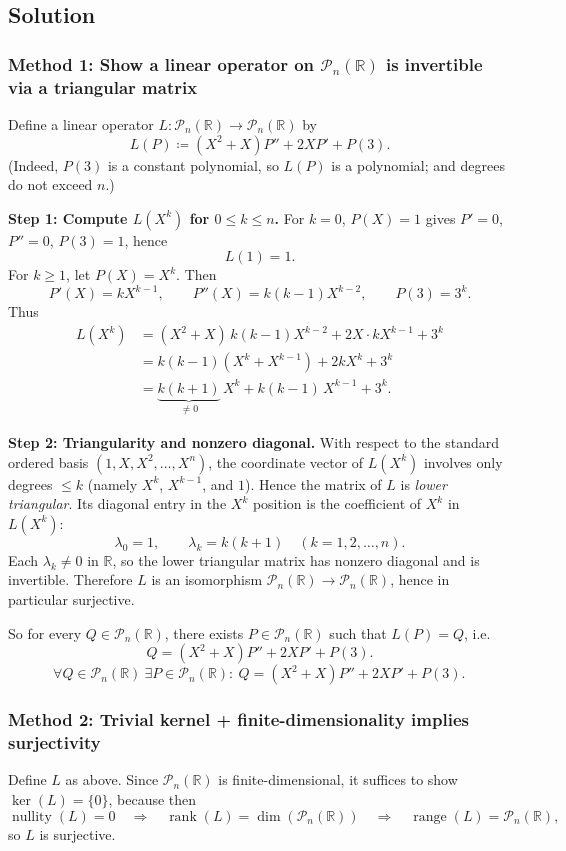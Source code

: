\documentclass[12pt]{article}
\newcommand{\R}{\mathbb{R}}
\newcommand{\cPn}{\mathcal{P}_n}
\DeclareMathOperator{\Range}{range}
\DeclareMathOperator{\Rank}{rank}
\DeclareMathOperator{\Nullity}{nullity}
\begin{document}
\subsection{Solution}

\subsubsection{Method 1: Show a linear operator on $\cPn(\R)$ is invertible via a triangular matrix}
Define a linear operator $L:\cPn(\R)\to \cPn(\R)$ by
\[
L(P)\coloneqq (X^2+X)P''+2X P' + P(3).
\]
(Indeed, $P(3)$ is a constant polynomial, so $L(P)$ is a polynomial; and degrees do not exceed $n$.)

\medskip
\noindent\textbf{Step 1: Compute $L(X^k)$ for $0\le k\le n$.}
For $k=0$, $P(X)=1$ gives $P'=0$, $P''=0$, $P(3)=1$, hence
\[
L(1)=1.
\]
For $k\ge 1$, let $P(X)=X^k$. Then
\[
P'(X)=kX^{k-1},\qquad P''(X)=k(k-1)X^{k-2},\qquad P(3)=3^k.
\]
Thus
\begin{align*}
L(X^k)
&=(X^2+X)\,k(k-1)X^{k-2}+2X\cdot kX^{k-1}+3^k\\
&=k(k-1)(X^k+X^{k-1})+2kX^k+3^k\\
&=\underbrace{k(k+1)}_{\neq 0}\,X^k + k(k-1)\,X^{k-1} + 3^k.
\end{align*}

\medskip
\noindent\textbf{Step 2: Triangularity and nonzero diagonal.}
With respect to the standard ordered basis $(1,X,X^2,\dots,X^n)$, the coordinate vector of $L(X^k)$ involves only degrees
$\le k$ (namely $X^k$, $X^{k-1}$, and $1$). Hence the matrix of $L$ is \emph{lower triangular}.
Its diagonal entry in the $X^k$ position is the coefficient of $X^k$ in $L(X^k)$:
\[
\lambda_0=1,\qquad \lambda_k=k(k+1)\quad (k=1,2,\dots,n).
\]
Each $\lambda_k\neq 0$ in $\R$, so the lower triangular matrix has nonzero diagonal and is invertible.
Therefore $L$ is an isomorphism $\cPn(\R)\to \cPn(\R)$, hence in particular surjective.

So for every $Q\in\cPn(\R)$, there exists $P\in\cPn(\R)$ such that $L(P)=Q$, i.e.
\[
Q=(X^2+X)P''+2XP'+P(3).
\]
\[
\boxed{\,\forall Q\in\cPn(\R)\ \exists P\in\cPn(\R):\ Q=(X^2+X)P''+2XP'+P(3).\;}
\]

\subsubsection{Method 2: Trivial kernel + finite-dimensionality implies surjectivity}
Define $L$ as above. Since $\cPn(\R)$ is finite-dimensional, it suffices to show $\ker(L)=\{0\}$, because then
\[
\Nullity(L)=0\quad\Longrightarrow\quad \Rank(L)=\dim(\cPn(\R))\quad\Longrightarrow\quad \Range(L)=\cPn(\R),
\]
so $L$ is surjective.
\end{document}
